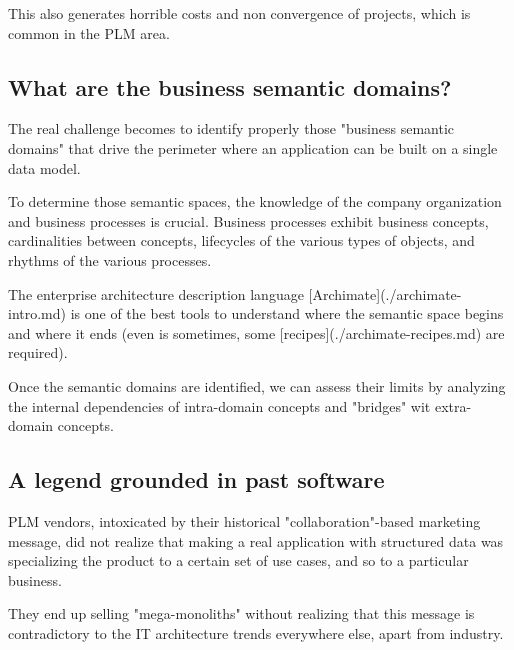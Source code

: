 \documentclass[]{article}
\begin{document}
This also generates horrible costs and non convergence of projects, which is common in the PLM area.

\subsection{What are the business semantic domains?}

The real challenge becomes to identify properly those "business semantic domains" that drive the perimeter where an application can be built on a single data model.

To determine those semantic spaces, the knowledge of the company organization and business processes is crucial. Business processes exhibit business concepts, cardinalities between concepts, lifecycles of the various types of objects, and rhythms of the various processes.

The enterprise architecture description language [Archimate](./archimate-intro.md) is one of the best tools to understand where the semantic space begins and where it ends (even is sometimes, some [recipes](./archimate-recipes.md) are required).

Once the semantic domains are identified, we can assess their limits by analyzing the internal dependencies of intra-domain concepts and "bridges" wit extra-domain concepts.

\subsection{A legend grounded in past software}

PLM vendors, intoxicated by their historical "collaboration"-based marketing message, did not realize that making a real application with structured data was specializing the product to a certain set of use cases, and so to a particular business.

They end up selling "mega-monoliths" without realizing that this message is contradictory to the IT architecture trends everywhere else, apart from industry.
\end{document}
